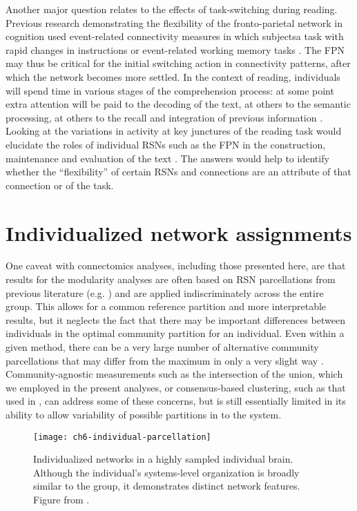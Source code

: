 Another major question relates to the effects of task-switching during reading. Previous research demonstrating the flexibility of the fronto-parietal network in cognition used event-related connectivity measures in which subjectsa task with rapid changes in instructions or event-related working memory tasks \citep{Cole2013, Braun2015}. The FPN may thus be critical for the initial switching action in connectivity patterns, after which the network becomes more settled. In the context of reading, individuals will spend time in various stages of the comprehension process: at some point extra attention will be paid to the decoding of the text, at others to the semantic processing, at others to the recall and integration of previous information \citep{Spreng2013}. Looking at the variations in activity at key junctures of the reading task would elucidate the roles of individual RSNs such as the FPN in the construction, maintenance and evaluation of the text \citep{Sakai2008}. The answers would help to identify whether the ``flexibility'' of certain RSNs and connections are an attribute of that connection or of the task.

\section{Individualized network assignments}

One caveat with connectomics analyses, including those presented here, are that results for the modularity analyses are often based on RSN parcellations from previous literature (e.g. \citep{Power2011}) and are applied indiscriminately across the entire group. This allows for a common reference partition and more interpretable results, but it neglects the fact that there may be important differences between individuals in the optimal community partition for an individual. Even within a given method, there can be a very large number of alternative community parcellations that may differ from the maximum in only a very slight way \citep{Good2010}. Community-agnostic measurements such as the intersection of the union, which we employed in the present analyses, or consensus-based clustering, such as that used in \citep{Power2011}, can address some of these concerns, but is still essentially limited in its ability to allow variability of possible partitions in to the system. 

\begin{figure}[t]
	\centering
	\texttt{[image: ch6-individual-parcellation]}
	\caption[Individualized networks in a highly sampled individual brain]{Individualized networks in a highly sampled individual brain. Although the individual's systems-level organization is broadly similar to the group, it demonstrates distinct network features. Figure from \citep{Laumann2015}.}
	\label{fig:ch6-individual-parcellation}
\end{figure}

